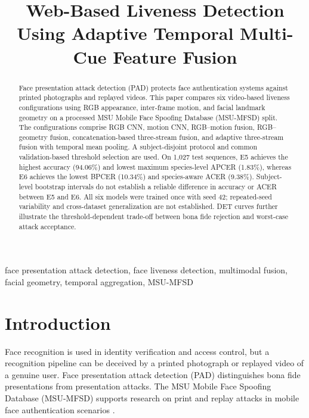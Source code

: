 \documentclass[a4paper,conference]{IEEEtran}
\begin{document}
\title{Web-Based Liveness Detection Using Adaptive Temporal Multi-Cue Feature Fusion}

\author{
}

\maketitle
\begin{abstract}
Face presentation attack detection (PAD) protects face authentication systems against printed photographs and replayed videos. This paper compares six video-based liveness configurations using RGB appearance, inter-frame motion, and facial landmark geometry on a processed MSU Mobile Face Spoofing Database (MSU-MFSD) split. The configurations comprise RGB CNN, motion CNN, RGB--motion fusion, RGB--geometry fusion, concatenation-based three-stream fusion, and adaptive three-stream fusion with temporal mean pooling. A subject-disjoint protocol and common validation-based threshold selection are used. On 1,027 test sequences, E5 achieves the highest accuracy (94.06\%) and lowest maximum species-level APCER (1.83\%), whereas E6 achieves the lowest BPCER (10.34\%) and species-aware ACER (9.38\%). Subject-level bootstrap intervals do not establish a reliable difference in accuracy or ACER between E5 and E6. All six models were trained once with seed 42; repeated-seed variability and cross-dataset generalization are not established. DET curves further illustrate the threshold-dependent trade-off between bona fide rejection and worst-case attack acceptance.
\end{abstract}
\begin{IEEEkeywords}
face presentation attack detection, face liveness detection, multimodal fusion, facial geometry, temporal aggregation, MSU-MFSD
\end{IEEEkeywords}

\section{Introduction}
Face recognition is used in identity verification and access control, but a recognition pipeline can be deceived by a printed photograph or replayed video of a genuine user. Face presentation attack detection (PAD) distinguishes bona fide presentations from presentation attacks. The MSU Mobile Face Spoofing Database (MSU-MFSD) supports research on print and replay attacks in mobile face authentication scenarios \cite{wen2015ida}.
\end{document}

